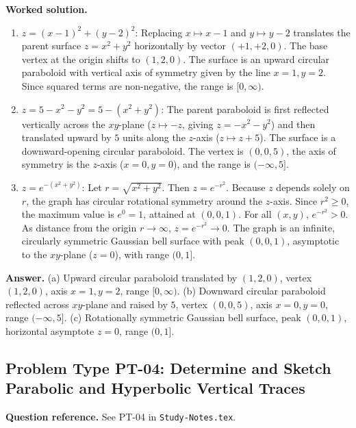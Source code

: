 \documentclass[11pt,letterpaper]{article}
\begin{document}
\textbf{Worked solution.}
\begin{enumerate}[label=(\alph*),leftmargin=*]
    \item $z = (x-1)^2 + (y-2)^2$:
    Replacing $x \mapsto x-1$ and $y \mapsto y-2$ translates the parent surface $z = x^2+y^2$ horizontally by vector $(+1, +2, 0)$. The base vertex at the origin shifts to $(1,2,0)$. The surface is an upward circular paraboloid with vertical axis of symmetry given by the line $x=1, y=2$. Since squared terms are non-negative, the range is $[0, \infty)$.
    \item $z = 5 - x^2 - y^2 = 5 - (x^2+y^2)$:
    The parent paraboloid is first reflected vertically across the $xy$-plane ($z \mapsto -z$, giving $z = -x^2-y^2$) and then translated upward by $5$ units along the $z$-axis ($z \mapsto z+5$). The surface is a downward-opening circular paraboloid. The vertex is $(0,0,5)$, the axis of symmetry is the $z$-axis ($x=0, y=0$), and the range is $(-\infty, 5]$.
    \item $z = e^{-(x^2+y^2)}$:
    Let $r = \sqrt{x^2+y^2}$. Then $z = e^{-r^2}$. Because $z$ depends solely on $r$, the graph has circular rotational symmetry around the $z$-axis. Since $r^2 \ge 0$, the maximum value is $e^0 = 1$, attained at $(0,0,1)$. For all $(x,y)$, $e^{-r^2} > 0$. As distance from the origin $r \to \infty$, $z = e^{-r^2} \to 0$. The graph is an infinite, circularly symmetric Gaussian bell surface with peak $(0,0,1)$, asymptotic to the $xy$-plane ($z=0$), with range $(0,1]$.
\end{enumerate}

\textbf{Answer.}
(a) Upward circular paraboloid translated by $(1,2,0)$, vertex $(1,2,0)$, axis $x=1, y=2$, range $[0, \infty)$.
(b) Downward circular paraboloid reflected across $xy$-plane and raised by $5$, vertex $(0,0,5)$, axis $x=0, y=0$, range $(-\infty, 5]$.
(c) Rotationally symmetric Gaussian bell surface, peak $(0,0,1)$, horizontal asymptote $z=0$, range $(0,1]$.

\subsection{Problem Type PT-04: Determine and Sketch Parabolic and Hyperbolic Vertical Traces}
\textbf{Question reference.} See PT-04 in \texttt{Study-Notes.tex}.
\end{document}
